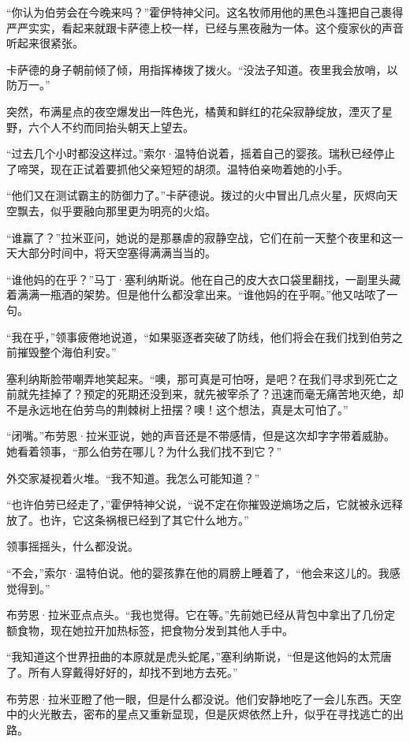 \documentclass[AutoFakeBold=true]{book}
\begin{document}
``你认为伯劳会在今晚来吗？''霍伊特神父问。这名牧师用他的黑色斗篷把自己裹得严严实实，看起来就跟卡萨德上校一样，已经与黑夜融为一体。这个瘦家伙的声音听起来很紧张。

卡萨德的身子朝前倾了倾，用指挥棒拨了拨火。``没法子知道。夜里我会放哨，以防万一。''

突然，布满星点的夜空爆发出一阵色光，橘黄和鲜红的花朵寂静绽放，湮灭了星野，六个人不约而同抬头朝天上望去。

``过去几个小时都没这样过。''索尔·温特伯说着，摇着自己的婴孩。瑞秋已经停止了啼哭，现在正试着要抓他父亲短短的胡须。温特伯亲吻着她的小手。

``他们又在测试霸主的防御力了。''卡萨德说。拨过的火中冒出几点火星，灰烬向天空飘去，似乎要融向那里更为明亮的火焰。

``谁赢了？''拉米亚问，她说的是那暴虐的寂静空战，它们在前一天整个夜里和这一天大部分时间中，将天空塞得满满当当的。

``谁他妈的在乎？''马丁·塞利纳斯说。他在自己的皮大衣口袋里翻找，一副里头藏着满满一瓶酒的架势。但是他什么都没拿出来。``谁他妈的在乎啊。''他又咕哝了一句。

``我在乎，''领事疲倦地说道，``如果驱逐者突破了防线，他们将会在我们找到伯劳之前摧毁整个海伯利安。''

塞利纳斯脸带嘲弄地笑起来。``噢，那可真是可怕呀，是吧？在我们寻求到死亡之前就先挂掉了？预定的死期还没到来，就先被宰杀了？迅速而毫无痛苦地灭绝，却不是永远地在伯劳鸟的荆棘树上扭摆？噢！这个想法，真是太可怕了。''

``闭嘴。''布劳恩·拉米亚说，她的声音还是不带感情，但是这次却字字带着威胁。她看着领事，``那么伯劳在哪儿？为什么我们找不到它？''

外交家凝视着火堆。``我不知道。我怎么可能知道？''

``也许伯劳已经走了，''霍伊特神父说，``说不定在你摧毁逆熵场之后，它就被永远释放了。也许，它这条祸根已经到了其它什么地方。''

领事摇摇头，什么都没说。

``不会，''索尔·温特伯说。他的婴孩靠在他的肩膀上睡着了，``他会来这儿的。我感觉得到。''

布劳恩·拉米亚点点头。``我也觉得。它在等。''先前她已经从背包中拿出了几份定额食物，现在她拉开加热标签，把食物分发到其他人手中。

``我知道这个世界扭曲的本原就是虎头蛇尾，''塞利纳斯说，``但是这他妈的太荒唐了。所有人穿戴得好好的，却找不到地方去死。''

布劳恩·拉米亚瞪了他一眼，但是什么都没说。他们安静地吃了一会儿东西。天空中的火光散去，密布的星点又重新显现，但是灰烬依然上升，似乎在寻找逃亡的出路。
\end{document}
